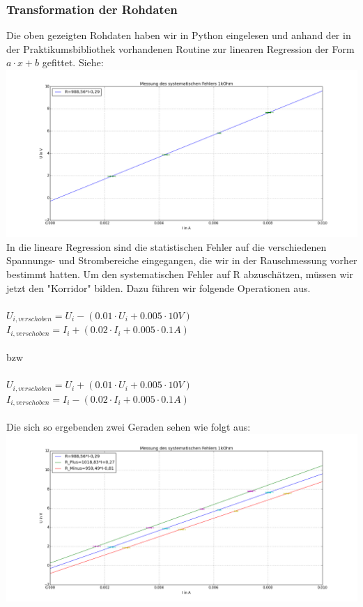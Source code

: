 \documentclass[12pt,a4paper]{article}
\begin{document}
\subsubsection{Transformation der Rohdaten}
Die oben gezeigten Rohdaten haben wir in Python eingelesen und anhand der in der Praktikumsbibliothek vorhandenen Routine zur linearen Regression der Form $a\cdot x + b $ gefittet. Siehe:\\
\includegraphics[scale=0.35]{lin_reg_single}
\\ In die lineare Regression sind die statistischen Fehler auf die verschiedenen Spannungs- und Strombereiche eingegangen, die wir in der Rauschmessung vorher bestimmt hatten. Um den systematischen Fehler auf R abzuschätzen, müssen wir jetzt den "Korridor" bilden. Dazu führen wir folgende Operationen aus.\\
\\$U_{i,verschoben} = U_i - (0.01 \cdot U_i + 0.005 \cdot 10V)$\\
$I_{i,verschoben} = I_i + (0.02 \cdot I_i + 0.005 \cdot 0.1A)$\\
\\bzw\\
\\$U_{i,verschoben} = U_i + (0.01 \cdot U_i + 0.005 \cdot 10V)$\\
$I_{i,verschoben} = I_i - (0.02 \cdot I_i + 0.005 \cdot 0.1A)$\\
\\Die sich so ergebenden zwei Geraden sehen wie folgt aus:\\
\includegraphics[scale=0.35]{U_gegen_I.png}
\end{document}
